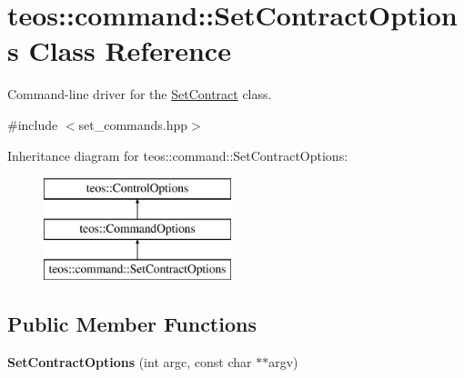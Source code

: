 \hypertarget{classteos_1_1command_1_1_set_contract_options}{}\section{teos\+:\+:command\+:\+:Set\+Contract\+Options Class Reference}
\label{classteos_1_1command_1_1_set_contract_options}


Command-\/line driver for the \mbox{\hyperlink{classteos_1_1command_1_1_set_contract}{Set\+Contract}} class.  




{\ttfamily \#include $<$set\+\_\+commands.\+hpp$>$}

Inheritance diagram for teos\+:\+:command\+:\+:Set\+Contract\+Options\+:\begin{figure}[H]
\begin{center}
\leavevmode
\includegraphics[height=3.000000cm]{classteos_1_1command_1_1_set_contract_options}
\end{center}
\end{figure}
\subsection*{Public Member Functions}
\begin{DoxyCompactItemize}
\item 
\mbox{\label{classteos_1_1command_1_1_set_contract_options_af39ea067efeaafd5cc82211f86e7bbbe}} 
{\bfseries Set\+Contract\+Options} (int argc, const char $\ast$$\ast$argv)
\end{DoxyCompactItemize}

